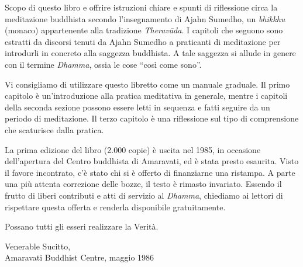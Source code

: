 
\vspace*{0.3\onelineskip}
Scopo di questo libro e offrire istruzioni chiare e spunti di
riflessione circa la meditazione buddhista secondo l'insegnamento di
Ajahn Sumedho, un \textit{bhikkhu} (monaco) appartenente alla tradizione
\textit{Theravāda}. I capitoli che seguono sono estratti da discorsi
tenuti da Ajahn Sumedho a praticanti di meditazione per introdurli in
concreto alla saggezza buddhista. A tale saggezza si allude in genere
con il termine \textit{Dhamma}, ossia le cose ``così come sono''.

Vi consigliamo di utilizzare questo libretto come un manuale graduale.
Il primo capitolo è un'introduzione alla pratica meditativa in generale,
mentre i capitoli della seconda sezione possono essere letti in sequenza
e fatti seguire da un periodo di meditazione. Il terzo capitolo è una
riflessione sul tipo di comprensione che scaturisce dalla pratica.

La prima edizione del libro (2.000 copie) è uscita nel 1985, in
occasione dell'apertura del Centro buddhista di Amaravati, ed è stata
presto esaurita. Visto il favore incontrato, c'è stato chi si è offerto
di finanziarne una ristampa. A parte una più attenta correzione delle
bozze, il testo è rimasto invariato. Essendo il frutto di liberi
contributi e atti di servizio al \textit{Dhamma}, chiediamo ai lettori di
rispettare questa offerta e renderla disponibile gratuitamente.

Possano tutti gli esseri realizzare la Verità.

\bigskip
{\par\raggedleft
Venerable Sucitto,\\
Amaravati Buddhist Centre, maggio 1986\\
\par}

